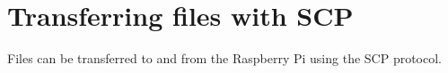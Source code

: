 \documentclass{article}
\begin{document}
\section{Transferring files with SCP}

Files can be transferred to and from the Raspberry Pi using the SCP protocol.






	
	







\end{document}
